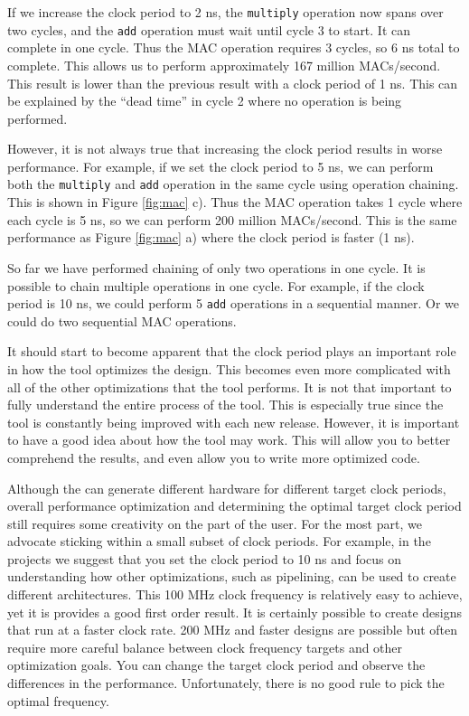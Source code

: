 If we increase the clock period to 2 ns, the \lstinline{multiply} operation now spans over two cycles, and the \lstinline{add} operation must wait until cycle 3 to start. It can complete in one cycle. Thus the MAC operation requires 3 cycles, so 6 ns total to complete. This allows us to perform approximately 167 million MACs/second. This result is lower than the previous result with a clock period of 1 ns. This can be explained by the ``dead time'' in cycle 2 where no operation is being performed.

However, it is not always true that increasing the clock period results in worse performance. For example, if we set the clock period to 5 ns, we can perform both the \lstinline{multiply} and \lstinline{add} operation in the same cycle using operation chaining. This is shown in Figure \ref{fig:mac} c). Thus the MAC operation takes 1 cycle where each cycle is 5 ns, so we can perform 200 million MACs/second. This is the same performance as Figure \ref{fig:mac} a) where the clock period is faster (1 ns). 

So far we have performed chaining of only two operations in one cycle. It is possible to chain multiple operations in one cycle. For example, if the clock period is 10 ns, we could perform 5 \lstinline{add} operations in a sequential manner. Or we could do two sequential MAC operations. 

It should start to become apparent that the clock period plays an important role in how the \VHLS tool optimizes the design. This becomes even more complicated with all of the other optimizations that the \VHLS tool performs. It is not that important to fully understand the entire process of the \VHLS tool. This is especially true since the tool is constantly being improved with each new release. However, it is important to have a good idea about how the tool may work. This will allow you to better comprehend the results, and even allow you to write more optimized code. 

Although the \VHLS can generate different hardware for different target clock periods, overall performance optimization and determining the optimal target clock period still requires some creativity on the part of the user. For the most part, we advocate sticking within a small subset of clock periods. For example, in the projects we suggest that you set the clock period to 10 ns and focus on understanding how other optimizations, such as pipelining, can be used to create different architectures. This 100 MHz clock frequency is relatively easy to achieve, yet it is provides a good first order result. It is certainly possible to create designs that run at a faster clock rate.  200 MHz and faster designs are possible but often require more careful balance between clock frequency targets and other optimization goals.  You can change the target clock period and observe the differences in the performance. Unfortunately, there is no good rule to pick the optimal frequency. 

